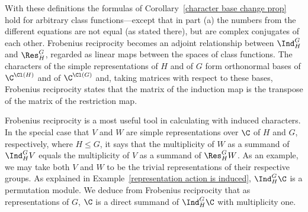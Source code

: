 With these definitions the formulas of Corollary~\ref{character base change prop} hold for arbitrary class functions---except that in part (a) the numbers from the different equations are not equal (as stated there), but are complex conjugates of each other. Frobenius reciprocity becomes an adjoint relationship between $\Ind^G_H$ and $\Res^G_H$, regarded as linear maps between the spaces of class functions. The characters of the simple representations of $H$ and of $G$ form orthonormal bases of $\C^{\Cl(H)}$ and of $\C^{\Cl(G)}$ and, taking matrices with respect to these bases, Frobenius reciprocity states that the matrix of the induction map is the transpose of the matrix of the restriction map.
\begin{example}
Frobenius reciprocity is a most useful tool in calculating with induced characters. In the special case that $V$ and $W$ are simple representations over $\C$ of $H$ and $G$, respectively, where $H\leq G$, it says that the multiplicity of $W$ as a summand of $\Ind^G_HV$ equals the multiplicity of $V$ as a summand of $\Res^G_HW$. As an example, we may take both $V$ and $W$ to be the trivial representations of their respective groups. As explained in Example~\ref{representation action is induced}, $\Ind^G_H\C$ is a permutation module. We deduce from Frobenius reciprocity that as representations of $G$, $\C$ is a direct summand of $\Ind^G_H\C$ with multiplicity one.
\end{example}
